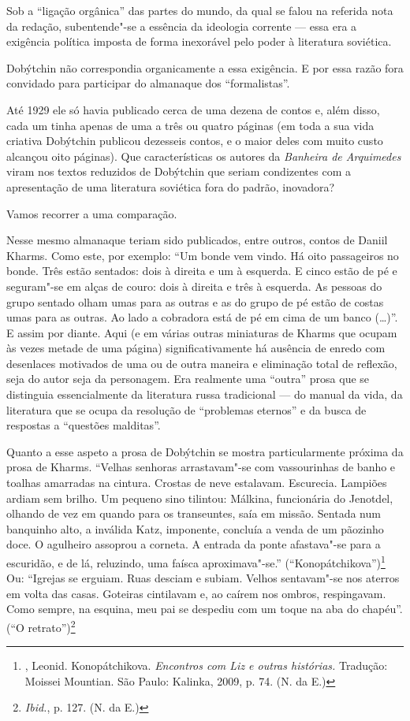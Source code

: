 Sob a ``ligação orgânica'' das partes do mundo, da qual se falou na
referida nota da redação, subentende"-se a essência da ideologia corrente
--- essa era a exigência política imposta de forma inexorável pelo poder
à literatura soviética.

Dobýtchin não correspondia organicamente a essa exigência. E por essa
razão fora convidado para participar do almanaque dos ``formalistas''.

Até 1929 ele só havia publicado cerca de uma dezena de contos e, além
disso, cada um tinha apenas de uma a três ou quatro páginas (em toda a
sua vida criativa Dobýtchin publicou dezesseis contos, e o maior deles
com muito custo alcançou oito páginas). Que características os autores
da \emph{Banheira de Arquimedes} viram nos textos reduzidos de Dobýtchin
que seriam condizentes com a apresentação de uma literatura soviética
fora do padrão, inovadora?

Vamos recorrer a uma comparação.

Nesse mesmo almanaque teriam sido publicados, entre outros, contos de
Daniil Kharms. Como este, por exemplo: ``Um bonde vem vindo. Há oito
passageiros no bonde. Três estão sentados: dois à direita e um à
esquerda. E cinco estão de pé e seguram"-se em alças de couro: dois à
direita e três à esquerda. As pessoas do grupo sentado olham umas para
as outras e as do grupo de pé estão de costas umas para as outras. Ao
lado a cobradora está de pé em cima de um banco (\ldots{})''. E assim por
diante. Aqui (e em várias outras miniaturas de Kharms que ocupam às
vezes metade de uma página) significativamente há ausência de enredo com
desenlaces motivados de uma ou de outra maneira e eliminação total de
reflexão, seja do autor seja da personagem. Era realmente uma ``outra''
prosa que se distinguia essencialmente da literatura russa tradicional
--- do manual da vida, da literatura que se ocupa da resolução de
``problemas eternos'' e da busca de respostas a ``questões malditas''.

Quanto a esse aspeto a prosa de Dobýtchin se mostra particularmente
próxima da prosa de Kharms. ``Velhas senhoras arrastavam"-se com
vassourinhas de banho e toalhas amarradas na cintura. Crostas de neve
estalavam. Escurecia. Lampiões ardiam sem brilho. Um pequeno sino
tilintou: Málkina, funcionária do Jenotdel, olhando de vez em quando
para os transeuntes, saía em missão. Sentada num banquinho alto, a
inválida Katz, imponente, concluía a venda de um pãozinho doce. O
agulheiro assoprou a corneta. A entrada da ponte afastava"-se para a
escuridão, e de lá, reluzindo, uma faísca aproximava"-se.''
(``Konopátchikova'')\footnote{\scalebox{.8}{DOBÝTCHIN}, Leonid. Konopátchikova.
  \emph{Encontros com Liz e outras histórias.} Tradução: Moissei
  Mountian. São Paulo: Kalinka, 2009, p. 74. (N. da E.)} Ou: ``Igrejas
se erguiam. Ruas desciam e subiam. Velhos sentavam"-se nos aterros em
volta das casas. Goteiras cintilavam e, ao caírem nos ombros,
respingavam. Como sempre, na esquina, meu pai se despediu com um toque
na aba do chapéu''. (``O retrato'')\footnote{\emph{Ibid.}, p. 127. (N.
  da E.)}

